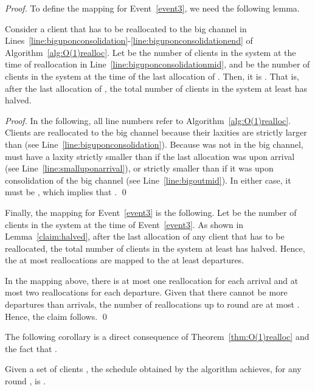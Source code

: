\begin{proof}
To define the mapping for Event~\ref{event3}, we need the following lemma.

\begin{lemma}
\label{claim:halved}
Consider a client  that has to be reallocated to the big channel in Lines~\ref{line:biguponconsolidation}-\ref{line:biguponconsolidationend} of Algorithm~\ref{alg:O(1)realloc}. 
Let  be the number of clients in the system at the time of reallocation in Line~\ref{line:biguponconsolidationmid}, and
 be the number of clients in the system at the time of the last allocation of .
Then, it is .
That is, after the last allocation of , the total number of clients in the system at least has halved.
\end{lemma}
\begin{proof}
In the following, all line numbers refer to Algorithm~\ref{alg:O(1)realloc}.
Clients are reallocated to the big channel because their laxities are strictly larger than  (see Line~\ref{line:biguponconsolidation}).
Because  was not in the big channel,  must have a laxity strictly smaller than  if the last allocation was upon arrival (see Line~\ref{line:smalluponarrival}), or strictly smaller than  if it was upon consolidation of the big channel (see Line~\ref{line:bigoutmid}). 
In either case, it must be , which implies that .
\qed\end{proof}

Finally, the mapping for Event~\ref{event3} is the following. Let  be the number of clients in the system at the time of Event~\ref{event3}. As shown in Lemma~\ref{claim:halved}, after the last allocation of any client that has to be reallocated, the total number of clients in the system at least has halved. Hence, the at most  reallocations are mapped to the at least  departures.

In the mapping above, there is at most one reallocation for each arrival and at most two reallocations for each departure. Given that there cannot be more departures than arrivals, the number of reallocations up to round  are at most . Hence, the claim follows.
\qed\end{proof}



The following corollary is a direct consequence of Theorem~\ref{thm:O(1)realloc} and the fact that .

\begin{corollary}
\label{corollary}
Given a set of clients , the schedule  obtained by the \constant algorithm achieves, for any round , is
.
\end{corollary}




